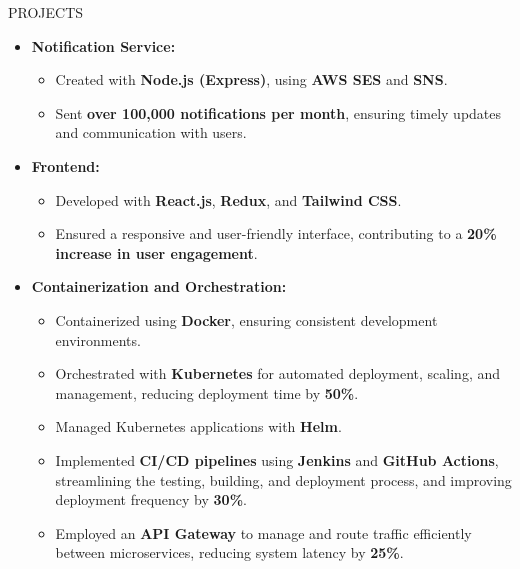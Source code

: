 \documentclass{resume} %
\begin{document}
\begin{rSection}{PROJECTS}
\begin{itemize}
    \item \textbf{Notification Service:}
      \begin{itemize}
        \item Created with \textbf{Node.js (Express)}, using \textbf{AWS SES} and \textbf{SNS}.
        \item Sent \textbf{over 100,000 notifications per month}, ensuring timely updates and communication with users.
      \end{itemize}

    \item \textbf{Frontend:}
      \begin{itemize}
        \item Developed with \textbf{React.js}, \textbf{Redux}, and \textbf{Tailwind CSS}.
        \item Ensured a responsive and user-friendly interface, contributing to a \textbf{20\% increase in user engagement}.
      \end{itemize}

    \item \textbf{Containerization and Orchestration:}
      \begin{itemize}
        \item Containerized using \textbf{Docker}, ensuring consistent development environments.
        \item Orchestrated with \textbf{Kubernetes} for automated deployment, scaling, and management, reducing deployment time by \textbf{50\%}.
        \item Managed Kubernetes applications with \textbf{Helm}.
        \item Implemented \textbf{CI/CD pipelines} using \textbf{Jenkins} and \textbf{GitHub Actions}, streamlining the testing, building, and deployment process, and improving deployment frequency by \textbf{30\%}.
        \item Employed an \textbf{API Gateway} to manage and route traffic efficiently between microservices, reducing system latency by \textbf{25\%}.
      \end{itemize}

\end{itemize}

\end{rSection}

\end{document}
